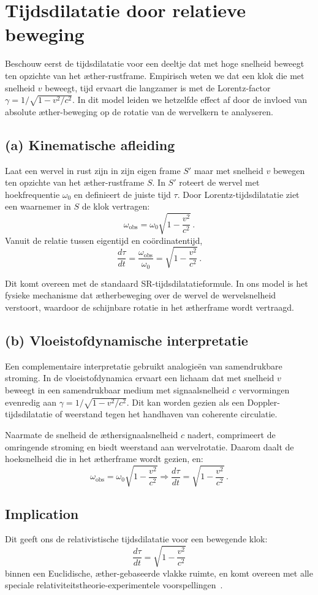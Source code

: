 \section{Tijdsdilatatie door relatieve beweging}

Beschouw eerst de tijdsdilatatie voor een deeltje dat met hoge snelheid beweegt ten opzichte van het æther-rustframe. Empirisch weten we dat een klok die met snelheid $v$ beweegt, tijd ervaart die langzamer is met de Lorentz-factor $\gamma = 1/\sqrt{1 - v^2/c^2}$. In dit model leiden we hetzelfde effect af door de invloed van absolute æther-beweging op de rotatie van de wervelkern te analyseren.

\subsection*{(a) Kinematische afleiding}

Laat een wervel in rust zijn in zijn eigen frame $S'$ maar met snelheid $v$ bewegen ten opzichte van het æther-rustframe $S$. In $S'$ roteert de wervel met hoekfrequentie $\omega_0$ en definieert de juiste tijd $\tau$. Door Lorentz-tijdsdilatatie ziet een waarnemer in $S$ de klok vertragen:
\[
    \omega_{\text{obs}} = \omega_0 \sqrt{1 - \frac{v^2}{c^2}} \,.
\]
Vanuit de relatie tussen eigentijd en coördinatentijd,
\[
    \frac{d\tau}{dt} = \frac{\omega_{\text{obs}}}{\omega_0} = \sqrt{1 - \frac{v^2}{c^2}} \,. \tag{2}
\]

Dit komt overeen met de standaard SR-tijdsdilatatieformule. In ons model is het fysieke mechanisme dat ætherbeweging over de wervel de wervelsnelheid verstoort, waardoor de schijnbare rotatie in het ætherframe wordt vertraagd.

\subsection*{(b) Vloeistofdynamische interpretatie}

Een complementaire interpretatie gebruikt analogieën van samendrukbare stroming. In de vloeistofdynamica ervaart een lichaam dat met snelheid $v$ beweegt in een samendrukbaar medium met signaalsnelheid $c$ vervormingen evenredig aan $\gamma = 1/\sqrt{1 - v^2/c^2}$. Dit kan worden gezien als een Doppler-tijdsdilatatie of weerstand tegen het handhaven van coherente circulatie.

Naarmate de snelheid de æthersignaalsnelheid $c$ nadert, comprimeert de omringende stroming en biedt weerstand aan wervelrotatie. Daarom daalt de hoeksnelheid die in het ætherframe wordt gezien, en:
\[
    \omega_{\text{obs}} = \omega_0 \sqrt{1 - \frac{v^2}{c^2}} \Rightarrow \frac{d\tau}{dt} = \sqrt{1 - \frac{v^2}{c^2}} \,. \tag{3}
\]

\subsection*{Implication}

Dit geeft ons de relativistische tijdsdilatatie voor een bewegende klok:
\[
    \boxed{\frac{d\tau}{dt} = \sqrt{1 - \frac{v^2}{c^2}}}
\]
binnen een Euclidische, æther-gebaseerde vlakke ruimte, en komt overeen met alle speciale relativiteitstheorie-experimentele voorspellingen~\cite{Rado2020-aether-Lorentz,Levy2009-aether-clock}.